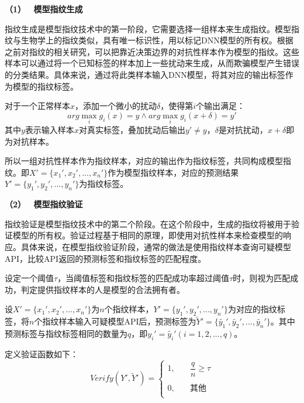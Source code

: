 \noindent\textbf{（1） \  模型指纹生成   }

指纹生成是模型指纹技术中的第一阶段，它需要选择一组样本来生成指纹。模型指纹与生物学上的指纹类似，具有唯一标识性，用以标记DNN模型的所有权。根据之前对指纹的相关研究\cite{zhao2020afa,lukas2019deep,cao2021ipguard}，可以把靠近决策边界的对抗性样本作为模型的指纹。这些样本可以通过将一个已知标签的样本加上一些扰动来生成，从而欺骗模型产生错误的分类结果。具体来说，通过将此类样本输入DNN模型，将其对应的输出标签作为模型的指纹标签。

对于一个正常样本$x$，添加一个微小的扰动$\delta$，使得第$i$个输出满足：
\begin{equation}
	\label{eq:4}
	arg \mathop{max} \limits_i g_i(x) = y \wedge arg \mathop{max} \limits_i g_i(x + \delta) = y'
\end{equation}
其中$y$表示输入样本$x$对真实标签，叠加扰动后输出$y' \neq y$，$\delta$是对抗扰动，$x + \delta$即为对抗样本。

所以一组对抗性样本作为指纹样本，对应的输出作为指纹标签，共同构成模型指纹。即$X' = \{x_1',x_2',...,x_n'\}$作为模型指纹样本，对应的预测结果$Y' = \{y_1', y_2',...,y_n'\}$为指纹标签。

\noindent\textbf{（2） \ 模型指纹验证   }

指纹验证是模型指纹技术中的第二个阶段。在这个阶段中，生成的指纹将被用于验证模型的所有权。验证过程基于相同的原理，即使用对抗性样本来检查模型的响应。具体来说，在模型指纹验证阶段，通常的做法是使用指纹样本查询可疑模型API，比较API返回的预测标签和指纹标签的匹配程度。

设定一个阈值$\tau$，当阈值标签和指纹标签的匹配成功率超过阈值$\tau$时，则视为匹配成功，判定提供指纹样本的人是模型的合法拥有者。

设$X' = \{x_1',x_2',...,x_n'\}$为$n$个指纹样本，$Y' = \{y_1', y_2',...,y_n'\}$为对应的指纹标签，将$n$个指纹样本输入可疑模型API后，预测标签为$\widetilde{Y}' = \{\widetilde{y_1}', \widetilde{y_2}',...,\widetilde{y_n}'\}$。其中预测标签与指纹标签相同的数量为$q$，即$y_i' = \widetilde{y_i}'(i = 1, 2,...,q)$。

定义验证函数如下：
\begin{equation}
	\label{eq:5}
	Verify(Y', \widetilde{Y}')= \left
	\{ 
	\begin{array}{ll} 
		1, &\quad \dfrac{q}{n} \geq \tau \\ 
		\\
		0, &\quad \mbox{其他}\\ 
	\end{array} 
	\right.
\end{equation}

